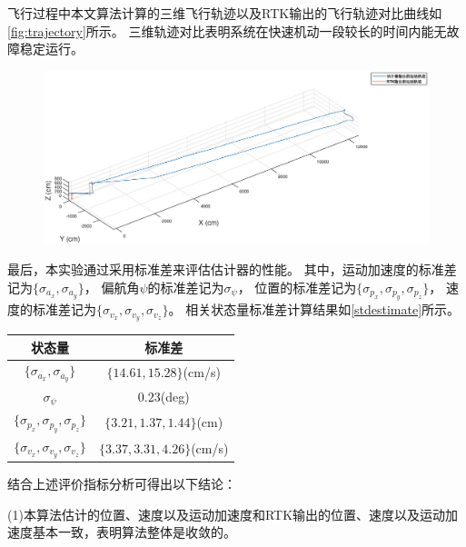 \documentclass[
  type=master
]{gdutthesis}
\begin{document}
飞行过程中本文算法计算的三维飞行轨迹以及RTK输出的飞行轨迹对比曲线如\autoref{fig:trajectory}所示。
三维轨迹对比表明系统在快速机动一段较长的时间内能无故障稳定运行。
\begin{figure}[H]
	\centering
	\includegraphics[width=1.0\textwidth]{trajectory2.eps}
	\label{fig:trajectory}
\end{figure}

最后，本实验通过采用标准差来评估估计器的性能。
其中，运动加速度的标准差记为$\big\{ \sigma_{a_x},\sigma_{a_y} \big\}$，
偏航角$\psi$的标准差记为$\sigma_{\psi}$，
位置的标准差记为$\big\{ \sigma_{p_x},\sigma_{p_y},\sigma_{p_z} \big\}$，
速度的标准差记为$\big\{ \sigma_{v_x},\sigma_{v_y},\sigma_{v_z} \big\}$。
相关状态量标准差计算结果如\autoref{stdestimate}所示。
\begin{table}[H]
	\label{stdestimate}
	\begin{tabular}{cc}
		\toprule
		状态量 & 标准差 \\
		\midrule
		$\big\{ \sigma_{a_x},\sigma_{a_y} \big\}$ & $\big\{ 14.61, 15.28 \big\}$(cm/s) \\
		$\sigma_{\psi}$ & $0.23$(deg)   \\
		$\big\{ \sigma_{p_x},\sigma_{p_y},\sigma_{p_z} \big\}$ & $\big\{ 3.21, 1.37, 1.44 \big\}$(cm)   \\
		$\big\{ \sigma_{v_x},\sigma_{v_y},\sigma_{v_z} \big\}$ & $\big\{ 3.37, 3.31, 4.26 \big\}$(cm/s)   \\
		\bottomrule
	\end{tabular}
\end{table}

结合上述评价指标分析可得出以下结论：

(1)本算法估计的位置、速度以及运动加速度和RTK输出的位置、速度以及运动加速度基本一致，表明算法整体是收敛的。
\end{document}
